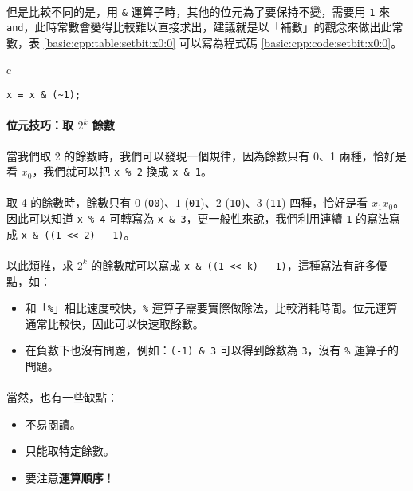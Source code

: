 \documentclass[12pt,a4paper,oneside]{article}
\begin{document}
\begin{CJK}{UTF8}{bkai}
\paragraph{}但是比較不同的是，用 \lstinline!&! 運算子時，其他的位元為了要保持不變，需要用 \lstinline!1! 來 \texttt{and}，此時常數會變得比較難以直接求出，建議就是以「補數」的觀念來做出此常數，表 \ref{basic:cpp:table:setbit:x0:0} 可以寫為程式碼 \ref{basic:cpp:code:setbit:x0:0}。

\begin{code}[h!]
\centering
\begin{tabular}{c}
\begin{lstlisting}
x = x & (~1);
\end{lstlisting}
\end{tabular}
\caption{將 $x_0$ 設為 \lstinline!0!}
\label{basic:cpp:code:setbit:x0:0}
\end{code}

\paragraph{位元技巧：取 $2^k$ 餘數}當我們取 
2 的餘數時，我們可以發現一個規律，因為餘數只有 0、1 兩種，恰好是看 $x_0$，我們就可以把 \lstinline!x % 2! 換成 \lstinline!x & 1!。

\paragraph{}取 4 的餘數時，餘數只有 $0$ (\lstinline!00!)、$1$ (\lstinline!01!)、$2$ (\lstinline!10!)、$3$ (\lstinline!11!) 四種，恰好是看 $x_1x_0$。因此可以知道 \lstinline!x % 4! 可轉寫為 \lstinline!x & 3!，更一般性來說，我們利用連續 \lstinline!1! 的寫法寫成 \lstinline!x & ((1 << 2) - 1)!。
\paragraph{}以此類推，求 $2^k$ 的餘數就可以寫成 \lstinline!x & ((1 << k) - 1)!，這種寫法有許多優點，如：
\begin{itemize}
\item 和「\lstinline!%!」相比速度較快，\lstinline!%! 運算子需要實際做除法，比較消耗時間。位元運算通常比較快，因此可以快速取餘數。
\item 在負數下也沒有問題，例如：\lstinline!(-1) & 3! 可以得到餘數為 \lstinline!3!，沒有 \lstinline!%! 運算子的問題。
\end{itemize}

\paragraph{}當然，也有一些缺點：
\begin{itemize}
\item 不易閱讀。
\item 只能取特定餘數。
\item 要注意\textbf{運算順序}！
\end{itemize}


\end{CJK}
\end{document}
